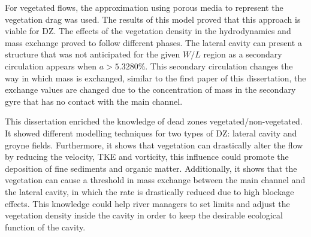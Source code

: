 For vegetated flows, the approximation using porous media to represent the vegetation drag was used. The results of this model proved that this approach is viable for DZ. The effects of the vegetation density in the hydrodynamics and mass exchange proved to follow different phases. The lateral cavity can present a structure that was not anticipated for the given $W/L$ region as a secondary circulation appears when $a>5.3280$\%. This secondary circulation changes the way in which mass is exchanged, similar to the first paper of this dissertation, the exchange values are changed due to the concentration of mass in the secondary gyre that has no contact with the main channel.

This dissertation enriched the knowledge of dead zones vegetated/non-vegetated. It showed different modelling techniques for two types of DZ: lateral cavity and groyne fields. Furthermore, it shows that vegetation can drastically alter the flow by reducing the velocity, TKE and vorticity, this influence could promote the deposition of fine sediments and organic matter. Additionally, it shows that the vegetation can cause a threshold in mass exchange between the main channel and the lateral cavity, in which the rate is drastically reduced due to high blockage effects. This knowledge could help river managers to set limits and adjust the vegetation density inside the cavity in order to keep the desirable ecological function of the cavity.

